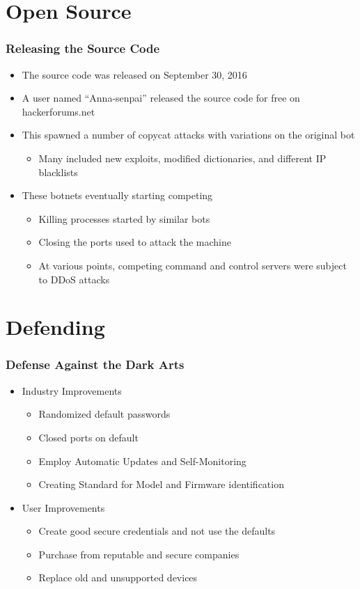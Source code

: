 \documentclass{beamer}
\begin{document}
\section{Open Source}

\begin{frame}
	\frametitle{Releasing the Source Code}
	\begin{itemize}
		\item The source code was released on September 30, 2016
		\item A user named ``Anna-senpai'' released the source code for free on hackerforums.net
		\item This spawned a number of copycat attacks with variations on the original bot
		\begin{itemize}
			\item Many included new exploits, modified dictionaries, and different IP blacklists
		\end{itemize}
		\item These botnets eventually starting competing
		\begin{itemize}
			\item Killing processes started by similar bots
			\item Closing the ports used to attack the machine
			\item At various points, competing command and control servers were subject to DDoS attacks
		\end{itemize}
	\end{itemize}
\end{frame}

\section{Defending}
\begin{frame}
    \frametitle{Defense Against the Dark Arts}
    \begin{itemize}
        \item Industry Improvements
            \begin{itemize}
                \item Randomized default passwords 
                \item Closed ports on default
                \item Employ Automatic Updates and Self-Monitoring
                \item Creating Standard for Model and Firmware identification
            \end{itemize}
        \item User Improvements
            \begin{itemize}
                \item Create good secure credentials and not use the defaults
                \item Purchase from reputable and secure companies
                \item Replace old and unsupported devices
            \end{itemize}
    \end{itemize}
\end{frame}
\end{document}
